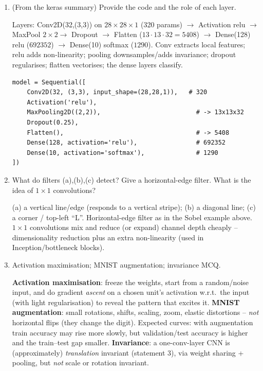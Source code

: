 \documentclass[10pt,a4paper]{article}
\newcommand{\q}[1]{\item #1}
\begin{document}
\begin{enumerate}[leftmargin=*,label=\textbf{Q\arabic*.}]
\q (From the keras summary) Provide the code and the role of each layer.
\begin{answerbox}
Layers: Conv2D(32,(3,3)) on $28\times28\times1$ (320 params) $\to$ Activation relu $\to$ MaxPool $2\times2 \to$ Dropout $\to$ Flatten ($13\cdot13\cdot32=5408$) $\to$ Dense(128) relu ($692352$) $\to$ Dense(10) softmax ($1290$). Conv extracts local features; relu adds non-linearity; pooling downsamples/adds invariance; dropout regularises; flatten vectorises; the dense layers classify.
\end{answerbox}
\begin{verbatim}
model = Sequential([
    Conv2D(32, (3,3), input_shape=(28,28,1)),   # 320
    Activation('relu'),
    MaxPooling2D((2,2)),                          # -> 13x13x32
    Dropout(0.25),
    Flatten(),                                    # -> 5408
    Dense(128, activation='relu'),                # 692352
    Dense(10, activation='softmax'),              # 1290
])
\end{verbatim}

\q What do filters (a),(b),(c) detect? Give a horizontal-edge filter. What is the idea of $1\times1$ convolutions?
\begin{answerbox}
(a) a vertical line/edge (responds to a vertical stripe); (b) a diagonal line; (c) a corner / top-left ``L''. Horizontal-edge filter as in the Sobel example above. $1\times1$ convolutions mix and reduce (or expand) channel depth cheaply -- dimensionality reduction plus an extra non-linearity (used in Inception/bottleneck blocks).
\end{answerbox}

\q Activation maximisation; MNIST augmentation; invariance MCQ.
\begin{answerbox}
\textbf{Activation maximisation}: freeze the weights, start from a random/noise input, and do gradient \emph{ascent} on a chosen unit's activation w.r.t.\ the input (with light regularisation) to reveal the pattern that excites it. \textbf{MNIST augmentation}: small rotations, shifts, scaling, zoom, elastic distortions -- \emph{not} horizontal flips (they change the digit). Expected curves: with augmentation train accuracy may rise more slowly, but validation/test accuracy is higher and the train--test gap smaller. \textbf{Invariance}: a one-conv-layer CNN is (approximately) \emph{translation} invariant (statement 3), via weight sharing + pooling, but \emph{not} scale or rotation invariant.
\end{answerbox}

\end{enumerate}
\end{document}
